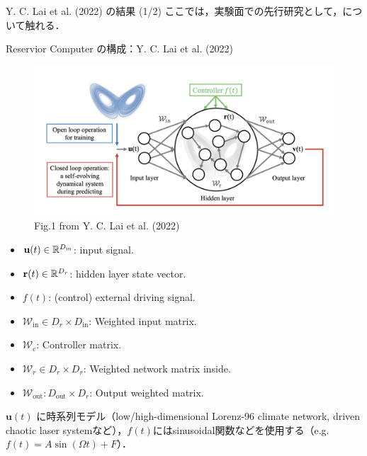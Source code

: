 \begin{frame}{Y. C. Lai et al. (2022) の結果 (1/2)}
    ここでは，実験面での先行研究として，\cite{Kong}について触れる．
    \begin{block}{Reservior Computer の構成：Y. C. Lai et al. (2022)}
    \vspace{0.1cm}
        \begin{minipage}{0.4\textwidth}
            \begin{figure}
                \includegraphics[width=\textwidth]{Fig/Fig.1_Lai.png}
                \caption*{Fig.1 from Y. C. Lai et al. (2022)}
                \label{Fig.1_Lai.png} %
            \end{figure}
        \end{minipage}%
        \begin{minipage}{0.6\textwidth}
            \begin{itemize}
                \item $\mathbf{u}(t) \in \mathbb{R}^{D_{\text{in}}}$: input signal. 
                \item $\mathbf{r}(t) \in \mathbb{R}^{D_r} $: hidden layer state vector.
                \item $f(t)$: (control) external driving signal.  
                \item $\mathcal{W}_{\text{in}} \in D_r \times D_{\text{in}}$: Weighted input matrix.  
                \item $\mathcal{W}_c$: Controller matrix.
                \item $ \mathcal{W}_r \in D_r \times D_{r}$: Weighted network matrix inside.
                \item $\mathcal{W}_{\text{out}}: D_{\text{out}} \times D_{r}$: Output weighted matrix.
            \end{itemize}
    \end{minipage}
    \end{block}
    $\mathbf{u}(t)$ に時系列モデル（low/high-dimensional Lorenz-96 climate network, driven chaotic laser systemなど），$f(t)$にはsinusoidal関数などを使用する（e.g. $f(t) = A \sin (\Omega t) + F$）．
\end{frame}

